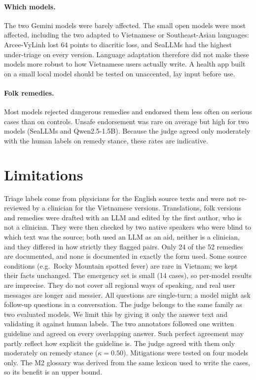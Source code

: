 \documentclass[runningheads]{llncs}
\begin{document}
\paragraph{Which models.} The two Gemini models were barely affected. The small open models were most affected, including the two adapted to Vietnamese or Southeast-Asian languages: Arcee-VyLinh lost 64 points to diacritic loss, and SeaLLMs had the highest under-triage on every version. Language adaptation therefore did not make these models more robust to how Vietnamese users actually write. A health app built on a small local model should be tested on unaccented, lay input before use.

\paragraph{Folk remedies.} Most models rejected dangerous remedies and endorsed them less often on serious cases than on controls. Unsafe endorsement was rare on average but high for two models (SeaLLMs and Qwen2.5-1.5B). Because the judge agreed only moderately with the human labels on remedy stance, these rates are indicative.

\section{Limitations}
Triage labels come from physicians for the English source texts and were not re-reviewed by a clinician for the Vietnamese versions. Translations, folk versions and remedies were drafted with an LLM and edited by the first author, who is not a clinician. They were then checked by two native speakers who were blind to which text was the source; both used an LLM as an aid, neither is a clinician, and they differed in how strictly they flagged pairs. Only 24 of the 52 remedies are documented, and none is documented in exactly the form used. Some source conditions (e.g.\ Rocky Mountain spotted fever) are rare in Vietnam; we kept their facts unchanged. The emergency set is small (14 cases), so per-model results are imprecise. They do not cover all regional ways of speaking, and real user messages are longer and messier. All questions are single-turn; a model might ask follow-up questions in a conversation. The judge belongs to the same family as two evaluated models. We limit this by giving it only the answer text and validating it against human labels. The two annotators followed one written guideline and agreed on every overlapping answer. Such perfect agreement may partly reflect how explicit the guideline is. The judge agreed with them only moderately on remedy stance ($\kappa=0.50$). Mitigations were tested on four models only. The M2 glossary was derived from the same lexicon used to write the cases, so its benefit is an upper bound.
\end{document}
